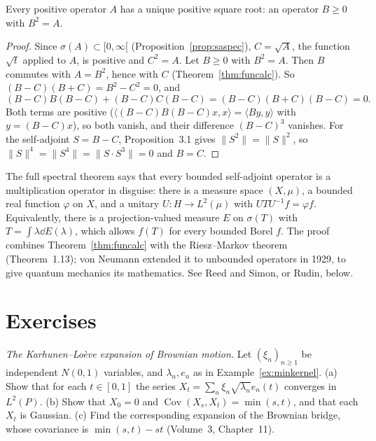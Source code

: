 \begin{corollary}\label{cor:sqrt}
Every positive operator $A$ has a unique positive square root: an operator $B\ge0$ with $B^2=A$.
\end{corollary}
\begin{proof}
Since $\sigma(A)\subset[0,\infty[$ (Proposition~\ref{prop:saspec}), $C=\sqrt{A}$, the function $\sqrt t$ applied to $A$, is positive and $C^2=A$. Let $B\ge0$ with $B^2=A$. Then $B$ commutes with $A=B^2$, hence with $C$
(Theorem~\ref{thm:funcalc}). So $(B-C)(B+C)=B^2-C^2=0$, and
\[(B-C)B(B-C)+(B-C)C(B-C)=(B-C)(B+C)(B-C)=0.\]
Both terms are positive ($\langle(B-C)B(B-C)x,x\rangle=\langle By,y\rangle$ with $y=(B-C)x$), so both vanish, and their difference $(B-C)^3$ vanishes. For the self-adjoint $S=B-C$, Proposition~3.1 gives $\|S^2\|=\|S\|^2$, so
$\|S\|^4=\|S^4\|=\|S\cdot S^3\|=0$ and $B=C$.
\end{proof}

\begin{remark}
The full spectral theorem says that every bounded self-adjoint operator is a multiplication operator in disguise: there is a measure space $(X,\mu)$, a bounded real function $\varphi$ on $X$, and a unitary
$U:H\to L^2(\mu)$ with $UTU^{-1}f=\varphi f$. Equivalently, there is a projection-valued measure $E$ on $\sigma(T)$ with $T=\int\lambda\dd E(\lambda)$, which allows $f(T)$ for every bounded Borel $f$. The proof
combines Theorem~\ref{thm:funcalc} with the Riesz--Markov theorem (Theorem~1.13); von Neumann extended it to unbounded operators in 1929, to give quantum mechanics its mathematics. See Reed and Simon, or Rudin, below.
\end{remark}

\section{Exercises}

\begin{exercise}[$\star\star$]\label{ex:kl}
\emph{The Karhunen--Lo\`eve expansion of Brownian motion.} Let $(\xi_n)_{n\ge1}$ be independent $N(0,1)$ variables, and $\lambda_n,e_n$ as in Example~\ref{ex:minkernel}. (a) Show that for each $t\in[0,1]$ the series
$X_t=\sum_n\xi_n\sqrt{\lambda_n}e_n(t)$ converges in $L^2(P)$. (b) Show that $X_0=0$ and $\operatorname{Cov}(X_s,X_t)=\min(s,t)$, and that each $X_t$ is Gaussian. (c) Find the corresponding expansion of the Brownian bridge,
whose covariance is $\min(s,t)-st$ (Volume~3, Chapter~11).
\end{exercise}

